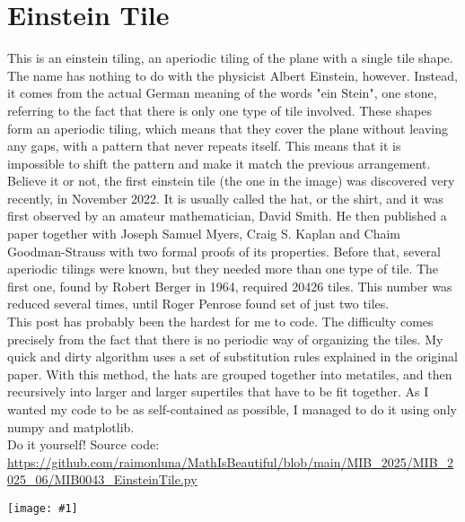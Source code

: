 \documentclass[12pt,landscape]{article}
\newcommand{\artpage}[3][]{%
  \begin{minipage}[t]{0.48\linewidth}
    \vspace{0pt} %
    \section*{#2} %
    \addcontentsline{toc}{section}{#2} %
    #3 %
  \end{minipage}%
  \hfill
  \begin{minipage}[t]{0.48\linewidth}
    \vspace{0pt} %
    \centering
    \texttt{[image: \#1]}
  \end{minipage}%
  \newpage
}
\begin{document}
\artpage[../Output/LowQuality/MIB0043_EinsteinTile.png]{Einstein Tile}{%
This is an einstein tiling, an aperiodic tiling of the plane with a single tile shape. The name has nothing to do with the physicist Albert Einstein, however. Instead, it comes from the actual German meaning of the words "ein Stein", one stone, referring to the fact that there is only one type of tile involved. These shapes form an aperiodic tiling, which means that they cover the plane without leaving any gaps, with a pattern that never repeats itself. This means that it is impossible to shift the pattern and make it match the previous arrangement.\\

Believe it or not, the first einstein tile (the one in the image) was discovered very recently, in November 2022. It is usually called the hat, or the shirt, and it was first observed by an amateur mathematician, David Smith. He then published a paper together with Joseph Samuel Myers, Craig S. Kaplan and Chaim Goodman-Strauss with two formal proofs of its properties. Before that, several aperiodic tilings were known, but they needed more than one type of tile. The first one, found by Robert Berger in 1964, required 20426 tiles. This number was reduced several times, until Roger Penrose found set of just two tiles. \\

This post has probably been the hardest for me to code. The difficulty comes precisely from the fact that there is no periodic way of organizing the tiles. My quick and dirty algorithm uses a set of substitution rules explained in the original paper. With this method, the hats are grouped together into metatiles, and then recursively into larger and larger supertiles that have to be fit together. As I wanted my code to be as self-contained as possible, I managed to do it using only numpy and matplotlib.\\

Do it yourself! Source code: \url{https://github.com/raimonluna/MathIsBeautiful/blob/main/MIB_2025/MIB_2025_06/MIB0043_EinsteinTile.py}
}
\end{document}
